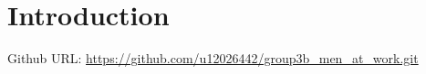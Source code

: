 \documentclass[pdftex,10pt,a4paper]{report}
\begin{document}


\newpage


\newpage
{}

\tableofcontents 

\newpage
{}


\chapter{Introduction}

Github URL: \url{https://github.com/u12026442/group3b_men_at_work.git}
\\
\end{document}
